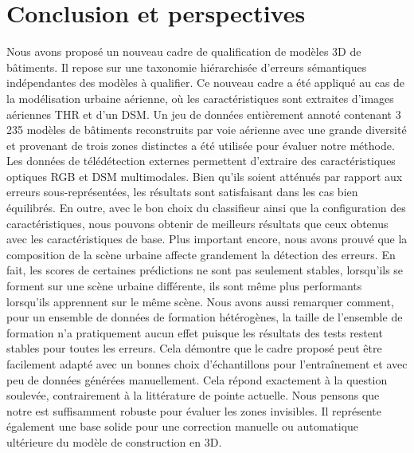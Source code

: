 \section*{Conclusion et perspectives}
    Nous avons proposé un nouveau cadre de qualification de modèles 3D de bâtiments.
    Il repose sur une taxonomie hiérarchisée d'erreurs sémantiques indépendantes des modèles à qualifier.
    Ce nouveau cadre a été appliqué au cas de la modélisation urbaine aérienne, où les caractéristiques sont extraites d'images aériennes THR et d'un DSM.
    Un jeu de données entièrement annoté contenant 3 235 modèles de bâtiments reconstruits par voie aérienne avec une grande diversité et provenant de trois zones distinctes a été utilisée pour évaluer notre méthode.
    Les données de télédétection externes permettent d'extraire des caractéristiques optiques RGB et DSM multimodales.
    Bien qu'ils soient atténués par rapport aux erreurs sous-représentées, les résultats sont satisfaisant dans les cas bien équilibrés.
    En outre, avec le bon choix du classifieur ainsi que la configuration des caractéristiques, nous pouvons obtenir de meilleurs résultats que ceux obtenus avec les caractéristiques de base.
    Plus important encore, nous avons prouvé que la composition de la scène urbaine affecte grandement la détection des erreurs.
    En fait, les scores de certaines prédictions ne sont pas seulement stables, lorsqu'ils se forment sur une scène urbaine différente, ils sont même plus performants lorsqu'ils apprennent sur le même scène.
    Nous avons aussi remarquer comment, pour un ensemble de données de formation hétérogènes, la taille de l'ensemble de formation n'a pratiquement aucun effet puisque les résultats des tests restent stables pour toutes les erreurs.
    Cela démontre que le cadre proposé peut être facilement adapté avec un bonnes choix d'échantillons pour l'entraînement et avec peu de données générées manuellement.
    Cela répond exactement à la question soulevée, contrairement à la littérature de pointe actuelle.
    Nous pensons que notre est suffisamment robuste pour évaluer les zones invisibles.
    Il représente également une base solide pour une correction manuelle ou automatique ultérieure du modèle de construction en 3D.
